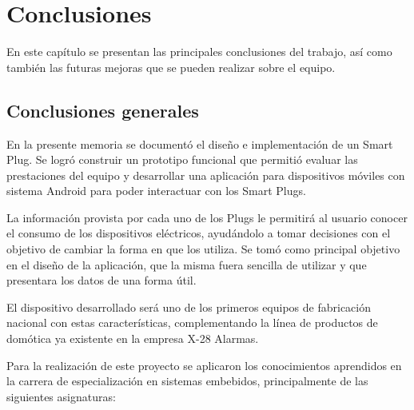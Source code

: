 
\chapter{Conclusiones} %

\label{Chapter5} %

En este capítulo se presentan las principales conclusiones del trabajo, así como también las futuras mejoras que se pueden realizar sobre el equipo.


\section{Conclusiones generales}

En la presente memoria se documentó el diseño e implementación de un Smart Plug. Se logró construir un prototipo funcional que permitió evaluar las prestaciones del equipo y desarrollar una aplicación para dispositivos móviles con sistema Android para poder interactuar con los Smart Plugs. 

La información provista por cada uno de los Plugs le permitirá al usuario conocer el consumo de los dispositivos eléctricos, ayudándolo a tomar decisiones con el objetivo de cambiar la forma en que los utiliza. Se tomó como principal objetivo en el diseño de la aplicación, que la misma fuera sencilla de utilizar y que presentara los datos de una forma útil.

El dispositivo desarrollado será uno de los primeros equipos de fabricación nacional con estas características, complementando la línea de productos de domótica ya existente en la empresa X-28 Alarmas.

Para la realización de este proyecto se aplicaron los conocimientos aprendidos en la carrera de especialización en sistemas embebidos, principalmente de las siguientes asignaturas:

